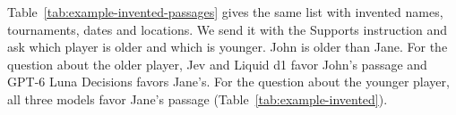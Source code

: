 Table~\ref{tab:example-invented-passages} gives the same list with invented names, tournaments, dates and locations. We send it with the Supports instruction and ask which player is older and which is younger. John is older than Jane. For the question about the older player, Jev and Liquid d1 favor John's passage and GPT-6 Luna Decisions favors Jane's. For the question about the younger player, all three models favor Jane's passage (Table~\ref{tab:example-invented}).

\begin{table}[H]
\caption{The questions and passages with invented names. John stands for Chanda Rubin and Jane for Maria Sharapova, and the passages are in the order of Table~\ref{tab:example-passages}.}
\label{tab:example-invented-passages}
\centering
\small

\end{table}

\begin{table}[H]
\caption{Model probability of John's and Jane's passages. Luna is GPT-6 Luna Decisions.}
\label{tab:example-invented}
\centering
\small

\end{table}
